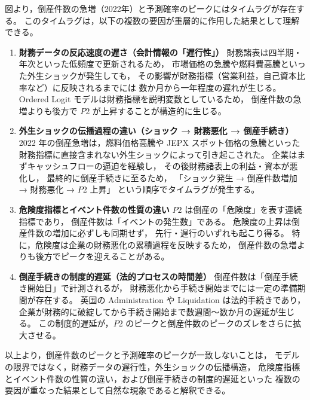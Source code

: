 図より，倒産件数の急増（2022年）と予測確率のピークにはタイムラグが存在する。
このタイムラグは，以下の複数の要因が重層的に作用した結果として理解できる。

\begin{enumerate}
    \item \textbf{財務データの反応速度の遅さ（会計情報の「遅行性」）}  
          財務諸表は四半期・年次といった低頻度で更新されるため，
          市場価格の急騰や燃料費高騰といった外生ショックが発生しても，
          その影響が財務指標（営業利益，自己資本比率など）に反映されるまでには
          数か月から一年程度の遅れが生じる。
          Ordered Logit モデルは財務指標を説明変数としているため，
          倒産件数の急増よりも後方で $P2$ が上昇することが構造的に生じる。

    \item \textbf{外生ショックの伝播過程の違い（ショック → 財務悪化 → 倒産手続き）}  
          2022 年の倒産急増は，燃料価格高騰や JEPX スポット価格の急騰といった
          財務指標に直接含まれない外生ショックによって引き起こされた。
          企業はまずキャッシュフローの逼迫を経験し，
          その後財務諸表上の利益・資本が悪化し，
          最終的に倒産手続きに至るため，
          「ショック発生 → 倒産件数増加 → 財務悪化 → $P2$ 上昇」
          という順序でタイムラグが発生する。

    \item \textbf{危険度指標とイベント件数の性質の違い}  
          $P2$ は倒産の「危険度」を表す連続指標であり，
          倒産件数は「イベントの発生数」である。
          危険度の上昇は倒産件数の増加に必ずしも同期せず，
          先行・遅行のいずれも起こり得る。
          特に，危険度は企業の財務悪化の累積過程を反映するため，
          倒産件数の急増よりも後方でピークを迎えることがある。

    \item \textbf{倒産手続きの制度的遅延（法的プロセスの時間差）}  
          倒産件数は「倒産手続き開始日」で計測されるが，
          財務悪化から手続き開始までには一定の準備期間が存在する。
          英国の Administration や Liquidation は法的手続きであり，
          企業が財務的に破綻してから手続き開始まで数週間〜数か月の遅延が生じる。
          この制度的遅延が，$P2$ のピークと倒産件数のピークのズレをさらに拡大させる。
\end{enumerate}

以上より，倒産件数のピークと予測確率のピークが一致しないことは，
モデルの限界ではなく，財務データの遅行性，外生ショックの伝播構造，
危険度指標とイベント件数の性質の違い，および倒産手続きの制度的遅延といった
複数の要因が重なった結果として自然な現象であると解釈できる。

